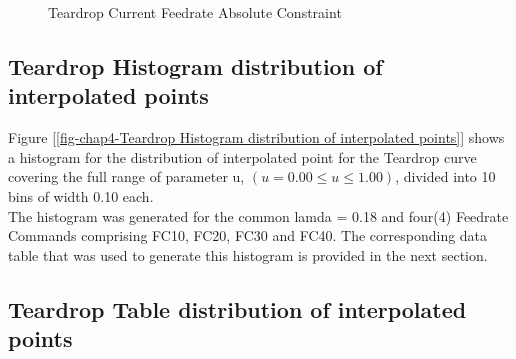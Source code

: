 \begin{figure}
	\caption  {Teardrop Current Feedrate Absolute Constraint}
	\label{img-chap4-Teardrop Current Feedrate Absolute Constraint.pdf}
\end{figure}	

\clearpage
\pagebreak

\subsection{Teardrop Histogram distribution of interpolated points}
\label{ssec-chap4-Teardrop Histogram distribution of interpolated points}

Figure [\ref{fig-chap4-Teardrop Histogram distribution of interpolated points}] shows a histogram for the distribution of interpolated point for the Teardrop curve covering the full range of parameter u, $(u = 0.00 \le u \le 1.00)$, divided into 10 bins of width 0.10 each. \\

The histogram was generated for the common lamda = 0.18 and four(4) Feedrate Commands comprising FC10, FC20, FC30 and FC40. The corresponding data table that was used to generate this histogram is provided in the next section.


\subsection{Teardrop Table distribution of interpolated points}
\label{ssec-chap4-Teardrop Table distribution of interpolated points}

